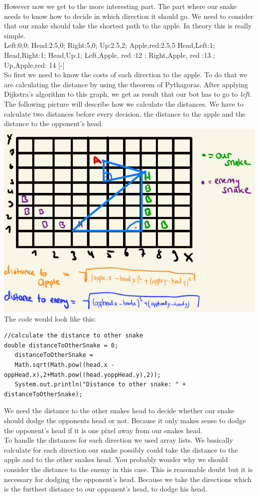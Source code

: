 \documentclass[a4paper,12pt]{article}
\begin{document}
However now we get to the more interesting part. The part where our snake needs to know how to decide in which direction it should go. We need to consider that our snake should take the shortest path to the apple. In theory this is really simple.\\
{
Left:0,0;
Head:2.5,0;
Right:5,0;
Up:2.5,2;
Apple,red:2.5,5
}
{
Head,Left:1;
Head,Right:1;
Head,Up:1; 
Left,Apple, red :12 ;
Right,Apple, red :13 ; 
Up,Apple,red: 14
}[-]
\dijkstra{}
\\So first we need to know the costs of each direction to the apple. To do that we are calculating the distance by using the theorem of Pythagoras. After applying Dijkstra's algorithm to this graph, we get as result that our bot has to go to \textit{left}. The following picture will describe how we calculate the distances. We have to calculate two distances before every decision, the distance to the apple and the distance to the opponent's head.
\includegraphics[scale=0.8]{calcs}
\newpage
The code would look like this:
\begin{verbatim}
//calculate the distance to other snake
double distanceToOtherSnake = 0;
   distanceToOtherSnake =  
   Math.sqrt(Math.pow((head.x - oppHead.x),2+Math.pow((head.yoppHead.y),2));
   System.out.println("Distance to other snake: " + distanceToOtherSnake);
\end{verbatim}
We need the distance to the other snakes head to decide whether our snake should dodge the opponents head or not. Because it only makes sense to dodge the opponent's head if it is one pixel away from our snakes head.\\
To handle the distances for each direction we used array lists. We basically calculate for each direction our snake possibly could take the  distance to the apple and to the other snakes head. You probably wonder why we should consider the distance to the enemy in this case. This is reasonable doubt but it is necessary for dodging the opponent's head. Because we take the directions which is the furthest distance to our opponent's head, to dodge his head.\\
\end{document}
